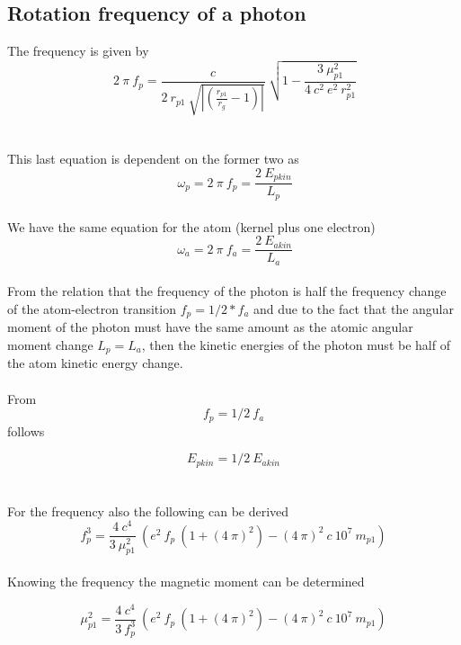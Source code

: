 \documentclass[10pt,titlepage]{article}
\begin{document}

\subsection{Rotation frequency of a photon}
The frequency is given by
\begin{equation}
\ 2 \ \pi \ f_p=\frac{c}{2 \ r_{p1} \ \sqrt{|(\frac{r_{p1}}{r_g}-1)|}} \ \sqrt{1-\frac{3 \ \mu_{p1}^2}{4 \ c^2 \ e^2 \ r_{p1}^2}}
\end{equation}
\\\\
This last equation is dependent on the former two as
\\
\begin{equation}
\ \omega_p=2 \ \pi \ f_p=\frac{2 \ E_{pkin}}{L_p}
\end{equation}
\\
We have the same equation for the atom (kernel plus one electron)
\begin{equation}
\ \omega_a=2 \ \pi \ f_a=\frac{2 \ E_{akin}}{L_a}
\end{equation}
\\
From the relation that the frequency of the photon is half the frequency change of the atom-electron transition $f_p=1/2*f_a$
and due to the fact that the angular moment of the photon must have the same amount as the atomic angular moment change $L_p=L_a$, then the kinetic energies of the photon must be half of the atom kinetic energy change.
\\\\
From
\begin{equation}
f_p=1/2 \ f_a
\end{equation}
follows

\begin{equation}
E_{pkin}=1/2 \ E_{akin}
\end{equation}
\\\\
For the frequency also the following can be derived
\begin{equation}\label{key}
f_p^3=\frac{4 \ c^4}{3 \ \mu_{p1}^2} \ (e^2 \ f_p \ (1+(4 \ \pi)^2)-(4 \ \pi)^2 \ c \ 10^7 \ m_{p1}
)
\end{equation}
\\
Knowing the frequency the magnetic moment can be determined

\begin{equation}
\mu_{p1}^2=\frac{4 \ c^4}{3 \ f_p^3} \ (e^2 \ f_p \ (1+(4 \ \pi)^2)-(4 \ \pi)^2 \ c \ 10^7 \ m_{p1})
\end{equation}
\end{document}
